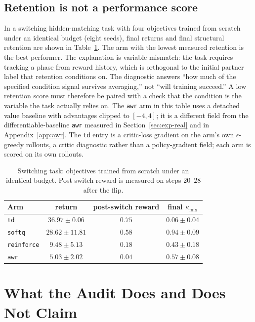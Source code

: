 \documentclass{article}
\newcommand{\kmix}{\kappa_{\mathrm{mix}}}
\begin{document}
\subsection{Retention is not a performance score}
\label{sec:exp-o4}

In a switching hidden-matching task with four objectives trained from scratch
under an identical budget (eight seeds), final returns and final structural
retention are shown in Table~\ref{tab:o4}. The arm with the lowest measured
retention is the best performer. The explanation is variable mismatch: the
task requires tracking a phase from reward history, which is orthogonal to the
initial partner label that retention conditions on. The diagnostic answers
``how much of the specified condition signal survives averaging,'' not ``will
training succeed.'' A low retention score must therefore be paired with a
check that the condition is the variable the task actually relies on. The
\texttt{awr} arm in this table uses a detached value baseline with advantages
clipped to $[-4,4]$; it is a different field from the differentiable-baseline
\texttt{awr} measured in Section~\ref{sec:exp-real} and in
Appendix~\ref{app:awr}. The \texttt{td} entry is a critic-loss gradient on the
arm's own $\epsilon$-greedy rollouts, a critic diagnostic rather than a
policy-gradient field; each arm is scored on its own rollouts.

\begin{table}[t]
\caption{Switching task: objectives trained from scratch under an identical
budget. Post-switch reward is measured on steps $20$--$28$ after the flip.}
\label{tab:o4}
\begin{center}
\begin{tabular}{lccc}
\toprule
Arm & return & post-switch reward & final $\kmix$ \\
\midrule
\texttt{td} & $\mathbf{36.97\pm0.06}$ & $0.75$ & $0.06\pm0.04$ \\
\texttt{softq} & $28.62\pm11.81$ & $0.58$ & $0.94\pm0.09$ \\
\texttt{reinforce} & $9.48\pm5.13$ & $0.18$ & $0.43\pm0.18$ \\
\texttt{awr} & $5.03\pm2.02$ & $0.04$ & $0.57\pm0.08$ \\
\bottomrule
\end{tabular}
\end{center}
\end{table}

\section{What the Audit Does and Does Not Claim}
\label{sec:claims}
\end{document}
